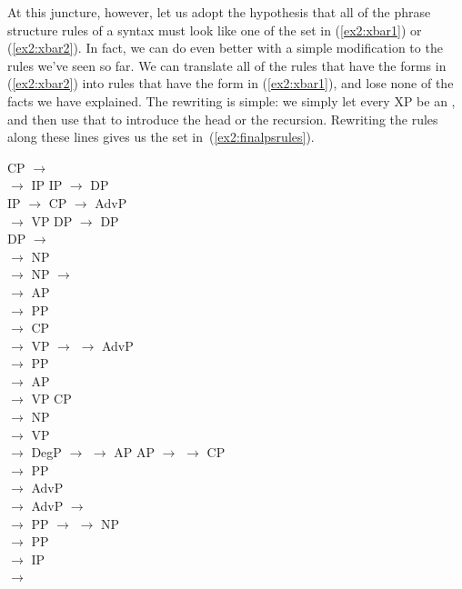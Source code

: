 At this juncture, however, let us adopt the hypothesis that all of the phrase structure rules of a syntax must look like one of the set in (\ref{ex2:xbar1}) or (\ref{ex2:xbar2}). In fact, we can do even better with a simple modification to the rules we've seen so far. We can translate all of the rules that have the forms in (\ref{ex2:xbar2}) into rules that have the form in (\ref{ex2:xbar1}), and lose none of the facts we have explained. The rewriting is simple: we simply let every XP be an , and then use that  to introduce the head or the recursion. Rewriting the rules along these lines gives us the set in~(\ref{ex2:finalpsrules}).
\begin{exe}
	\raggedright
	\ex \label{ex2:finalpsrules} 
	\begin{xlist}
		\ex
		CP $\rightarrow$ \\
		 $\rightarrow$  IP
		\ex 
		IP $\rightarrow$ DP \\ 
		IP $\rightarrow$ CP 
		\ex 
		 $\rightarrow$ AdvP \\ 
		 $\rightarrow$  VP
		\ex
		DP $\rightarrow$ DP \\
		DP $\rightarrow$ \\
		 $\rightarrow$  NP\\
		 $\rightarrow$ 
		\ex 
	NP $\rightarrow$ \\
	\ex
	 $\rightarrow$ AP \\
	 $\rightarrow$  PP\\
	 $\rightarrow$  CP\\
	 $\rightarrow$ 
	\ex
	VP $\rightarrow$ 
	\ex
	 $\rightarrow$ AdvP \\
	 $\rightarrow$  PP\\
	 $\rightarrow$  AP\\
	 $\rightarrow$ VP CP\\
	 $\rightarrow$  NP\\
	 $\rightarrow$  VP\\
	 $\rightarrow$ 
	\ex 
	DegP $\rightarrow$ 
	\ex 
	 $\rightarrow$  AP
	\ex
	AP $\rightarrow$ 
	\ex
	 $\rightarrow$  CP\\
	 $\rightarrow$  PP\\
	 $\rightarrow$ AdvP \\
	 $\rightarrow$ 
	\ex
	AdvP $\rightarrow$ \\
	 $\rightarrow$ 
	\pagebreak
	\ex 
	PP $\rightarrow$ 
	\ex
	 $\rightarrow$  NP\\
	 $\rightarrow$  PP\\
	 $\rightarrow$  IP\\
	 $\rightarrow$ 
	\end{xlist}	
\end{exe}

